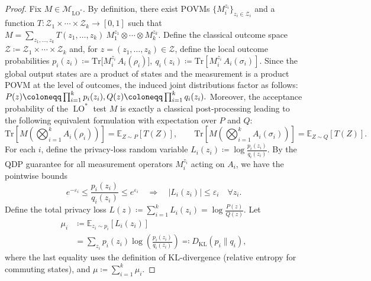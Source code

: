\documentclass[11pt]{article}
\def\Tr{\mathrm{Tr}}
\theoremstyle{plain}
\theoremstyle{remark}
\begin{document}
\begin{proof}

Fix $M\in\mathcal M_{\operatorname{LO}^*}$. By definition, there exist POVMs
$\{M_i^{z_i}\}_{z_i\in\mathcal Z_i}$ and a function $T:\mathcal Z_1\times\cdots\times\mathcal Z_k\to[0,1]$
such that $
    M=\sum_{z_1,\ldots,z_k} T(z_1,\ldots,z_k) \ M_1^{z_1}\otimes\cdots\otimes M_k^{z_k}.
$
Define the classical outcome space $\mathcal{Z} \coloneqq \mathcal {Z}_1\times\cdots\times\mathcal {Z}_k$ and,
for $z=(z_1,\ldots,z_k)\in\mathcal Z$, define the local outcome probabilities
$
    p_i(z_i)\coloneqq\Tr\!\big[M_i^{z_i}\,A_i(\rho_i)\big],
\
q_i(z_i)\coloneqq\Tr\!\left[M_i^{z_i}\,A_i(\sigma_i)\right].
$
Since the global output states are a product of states and the measurement is a product POVM at the level of outcomes,
the induced joint distributions factor as follows:
$
    P(z)\coloneqq\prod_{i=1}^k p_i(z_i),
\\
Q(z)\coloneqq\prod_{i=1}^k q_i(z_i).$
Moreover, the acceptance probability of the $\operatorname{LO}^*$ test $M$ is exactly a classical post-processing leading to the following equivalent formulation with expectation over $P$ and $Q$:
\begin{equation}\label{eq:accept-as-expectation}
\Tr\!\left[ M \left( \bigotimes_{i=1}^k A_i(\rho_i) \right) \right] = \mathbb{E}_{Z\sim P}[T(Z)],
\qquad
\Tr\!\left[ M \left( \bigotimes_{i=1}^k A_i(\sigma_i) \right) \right] = \mathbb{E}_{Z\sim Q}[T(Z)].
\end{equation}
For each $i$, define the privacy-loss random variable
$
    L_i(z_i)\coloneqq\log\frac{p_i(z_i)}{q_i(z_i)}.
$
By the QDP guarantee for  all measurement operators $M_i^{z_i}$ acting on $A_i$,
we have the pointwise bounds
\begin{equation}\label{eq:Li-bounded}
e^{-\varepsilon_i}\leq \frac{p_i(z_i)}{q_i(z_i)} \leq  e^{\varepsilon_i}
\quad \Longrightarrow \quad
|L_i(z_i)|\le \varepsilon_i\quad \forall z_i.
\end{equation}
Define the total privacy loss
$
    L(z)\coloneqq\sum_{i=1}^k L_i(z_i)=\log\frac{P(z)}{Q(z)}.
$
Let 
\begin{align}
    \mu_i & \coloneqq \mathbb{E}_{z_i\sim p_i}[L_i(z_i)] \\
   & = \sum_{z_i} p_i(z_i) \log\!\left( \frac{p_i(z_i)}{q_i(z_i)}\right)  \eqqcolon D_{\operatorname{KL}}(p_i\|q_i),
\end{align}
where the last equality uses the definition of KL-divergence (relative entropy for commuting states), and $  \mu\coloneqq\sum_{i=1}^k\mu_i.$


\end{proof}
\end{document}
